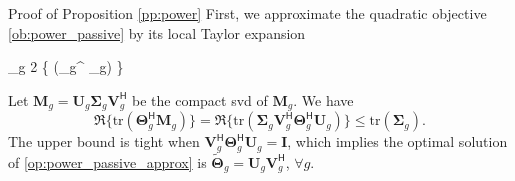 \documentclass[journal]{IEEEtran}
\begin{document}
\begin{appendix}
\begin{subsection}{Proof of Proposition \ref{pp:power}}
		First, we approximate the quadratic objective \eqref{ob:power_passive} by its local Taylor expansion
		\begin{maxi!}
			{\scriptstyle{\mathbf{\Theta}}}{\sum_g 2 \Re\bigl\{ (\mathbf{\Theta}_g^ _g) \bigr\}}{\label{op:power_passive_approx}}{\label{ob:power_passive_approx}}
		\end{maxi!}
		Let $\mathbf{M}_g = \mathbf{U}_g \mathbf{\Sigma}_g \mathbf{V}_g^\mathsf{H}$ be the compact \gls{svd} of $\mathbf{M}_g$.
		We have
		\begin{equation}
			\Re \bigl\{\mathrm{tr}(\mathbf{\Theta}_g^\mathsf{H} \mathbf{M}_g)\bigr\} = \Re \bigl\{ \mathrm{tr}(\mathbf{\Sigma}_g \mathbf{V}_g^\mathsf{H} \mathbf{\Theta}_g^\mathsf{H} \mathbf{U}_g) \bigr\} \le \mathrm{tr}(\mathbf{\Sigma}_g).
		\end{equation}
		The upper bound is tight when $\mathbf{V}_g^\mathsf{H} \mathbf{\Theta}_g^\mathsf{H} \mathbf{U}_g = \mathbf{I}$, which implies the optimal solution of \eqref{op:power_passive_approx} is $\tilde{\mathbf{\Theta}}_g = \mathbf{U}_g \mathbf{V}_g^\mathsf{H}$, $\forall g$.


\end{subsection}
\end{appendix}
\end{document}
